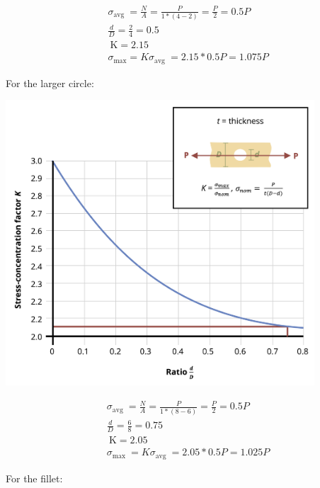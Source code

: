 \documentclass[
  letterpaper,
  DIV=11,
  numbers=noendperiod]{scrreprt}
\begin{document}
\begin{tcolorbox}
\begin{tcolorbox}
\[
\begin{aligned}
& \sigma_{\text {avg }}=\frac{N}{A}=\frac{P}{1 *(4-2)}=\frac{P}{2}=0.5 P \\
& \frac{d}{D}=\frac{2}{4}=0.5 \\
& \mathrm{~K}=2.15 \\
& \sigma_{\max }=K \sigma_{\text {avg }}=2.15 * 0.5 P=1.075 P
\end{aligned}
\]

For the larger circle:

\begin{center}
\includegraphics[width=4.54167in,height=\textheight]{images/PNGs/Example 5.2 part 3.png}
\end{center}

\[
\begin{aligned}
& \sigma_{\text {avg }}=\frac{N}{A}=\frac{P}{1 *(8-6)}=\frac{P}{2}=0.5 P \\
& \frac{d}{D}=\frac{6}{8}=0.75 \\
& \mathrm{~K}=2.05 \\
& \sigma_{\text {max }}=K \sigma_{\text {avg }}=2.05 * 0.5 P=1.025 P
\end{aligned}
\]

For the fillet:


\end{tcolorbox}
\end{tcolorbox}
\end{document}

